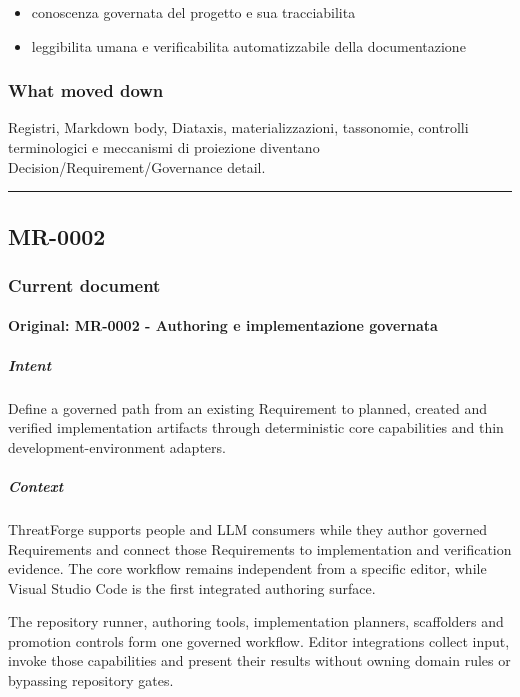 \documentclass[
  10pt,
]{article}
\providecommand{\tightlist}{%
  \setlength{\itemsep}{0pt}\setlength{\parskip}{0pt}}
\begin{document}
\begin{itemize}
\tightlist
\item
  conoscenza governata del progetto e sua tracciabilita
\item
  leggibilita umana e verificabilita automatizzabile della
  documentazione
\end{itemize}

\subsubsection{What moved down}\label{what-moved-down}

Registri, Markdown body, Diataxis, materializzazioni, tassonomie,
controlli terminologici e meccanismi di proiezione diventano
Decision/Requirement/Governance detail.

\begin{center}\rule{0.5\linewidth}{0.5pt}\end{center}

\subsection{MR-0002}\label{mr-0002}

\subsubsection{Current document}\label{current-document-1}

\paragraph{Original: MR-0002 - Authoring e implementazione
governata}\label{original-mr-0002---authoring-e-implementazione-governata}

\subparagraph{Intent}\label{intent-2}

Define a governed path from an existing Requirement to planned, created
and verified implementation artifacts through deterministic core
capabilities and thin development-environment adapters.

\subparagraph{Context}\label{context-2}

ThreatForge supports people and LLM consumers while they author governed
Requirements and connect those Requirements to implementation and
verification evidence. The core workflow remains independent from a
specific editor, while Visual Studio Code is the first integrated
authoring surface.

The repository runner, authoring tools, implementation planners,
scaffolders and promotion controls form one governed workflow. Editor
integrations collect input, invoke those capabilities and present their
results without owning domain rules or bypassing repository gates.
\end{document}
